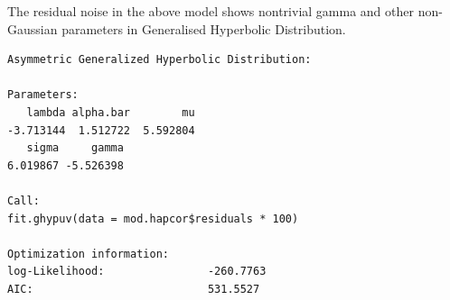\documentclass{amsart}
\begin{document}
The residual noise in the above model shows nontrivial gamma and other non-Gaussian parameters in Generalised Hyperbolic Distribution.

\begin{verbatim}
Asymmetric Generalized Hyperbolic Distribution:

Parameters:
   lambda alpha.bar        mu
-3.713144  1.512722  5.592804               
   sigma     gamma 
6.019867 -5.526398 

Call:
fit.ghypuv(data = mod.hapcor$residuals * 100)

Optimization information:
log-Likelihood:                -260.7763 
AIC:                           531.5527 
\end{verbatim}
\end{document}
